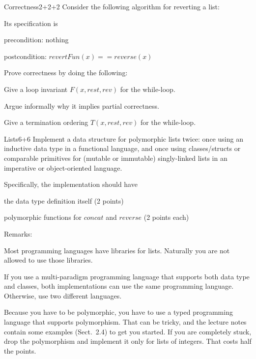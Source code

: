 \documentclass[a4paper]{article}
\begin{document}
\header

\begin{problem}{Correctness}{2+2+2}
Consider the following algorithm for reverting a list:
\begin{acode}
\end{acode}

Its specification is
\begin{compactitem}
 \item precondition: nothing
 \item postcondition: $revertFun(x)==reverse(x)$
\end{compactitem}

Prove correctness by doing the following:
\begin{compactenum}
 \item Give a loop invariant $F(x,rest,rev)$ for the while-loop.
 \item Argue informally why it implies partial correctness. 
 \item Give a termination ordering $T(x,rest,rev)$ for the while-loop.
\end{compactenum}
\end{problem}

\begin{problem}{Lists}{6+6}
Implement a data structure for polymorphic lists twice: once using an inductive data type in a functional language, and once using classes/structs or comparable primitives for (mutable or immutable) singly-linked lists in an imperative or object-oriented language.

Specifically, the implementation should have
\begin{compactitem}
 \item the data type definition itself (2 points)
 \item polymorphic functions for $concat$ and $reverse$ (2 points each)
\end{compactitem}

Remarks:
\begin{compactitem}
\item Most programming languages have libraries for lists.
Naturally you are not allowed to use those libraries.
\item If you use a multi-paradigm programming language that supports both data type and classes, both implementations can use the same programming language.
Otherwise, use two different languages.
\item Because you have to be polymorphic, you have to use a typed programming language that supports polymorphism.
That can be tricky, and the lecture notes contain some examples (Sect.~2.4) to get you started.
If you are completely stuck, drop the polymorphism and implement it only for lists of integers.
That costs half the points.
\end{compactitem}
\end{problem}
\end{document}

